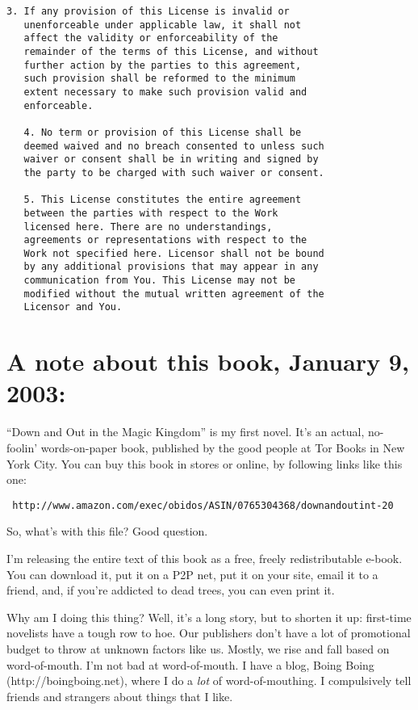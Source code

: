 \begin{Verbatim}[fontsize=\scriptsize]
   3. If any provision of this License is invalid or
   unenforceable under applicable law, it shall not
   affect the validity or enforceability of the
   remainder of the terms of this License, and without
   further action by the parties to this agreement,
   such provision shall be reformed to the minimum
   extent necessary to make such provision valid and
   enforceable.

   4. No term or provision of this License shall be
   deemed waived and no breach consented to unless such
   waiver or consent shall be in writing and signed by
   the party to be charged with such waiver or consent.

   5. This License constitutes the entire agreement
   between the parties with respect to the Work
   licensed here. There are no understandings,
   agreements or representations with respect to the
   Work not specified here. Licensor shall not be bound
   by any additional provisions that may appear in any
   communication from You. This License may not be
   modified without the mutual written agreement of the
   Licensor and You.
\end{Verbatim}
\section{A note about this book, January 9, 2003:}

“Down and Out in the Magic Kingdom” is my first novel. It's an
actual, no-foolin' words-on-paper book, published by the good
people at Tor Books in New York City. You can buy this book in
stores or online, by following links like this one:

\texttt{\scriptsize
http://www.amazon.com/exec/obidos/ASIN/0765304368/downandoutint-20}

So, what's with this file? Good question.

I'm releasing the entire text of this book as a free, freely
redistributable e-book. You can download it, put it on a P2P net,
put it on your site, email it to a friend, and, if you're addicted
to dead trees, you can even print it.

Why am I doing this thing? Well, it's a long story, but to shorten
it up: first-time novelists have a tough row to hoe. Our publishers
don't have a lot of promotional budget to throw at unknown factors
like us. Mostly, we rise and fall based on word-of-mouth. I'm not
bad at word-of-mouth. I have a blog, Boing Boing
(http://boingboing.net), where I do a \emph{lot} of
word-of-mouthing. I compulsively tell friends and strangers about
things that I like.

